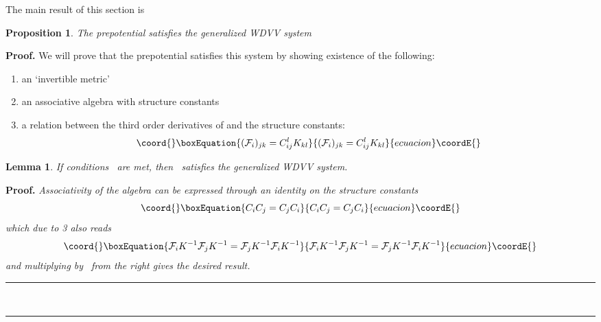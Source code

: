 \documentclass[a4paper,11pt]{article}
\newtheorem{lemma}[theorem]{Lemma}
\newtheorem{proposition}[theorem]{Proposition}
\newenvironment{proof}[1][Proof]{\textbf{#1.} }{\ \rule{0.5em}{0.5em}}
\numberwithin{equation}{section}
\begin{document}
\bigskip

\noindent The main result of this section is

\begin{proposition}
The prepotential satisfies the generalized WDVV system
\end{proposition}

\begin{proof}
We will prove that the prepotential satisfies this system by showing
existence of the following:

\begin{enumerate}
\item  an `invertible metric' \coordHE{}

\item  an associative algebra with structure constants \coordHE{}

\item  a relation between the third order derivatives of \coordHE{} and
the structure constants: 
\begin{equation}\coord{}\boxEquation{
(\mathcal{F}_{i})_{jk}=C_{ij}^{l}K_{kl}  \label{relation}
}{
(\mathcal{F}_{i})_{jk}=C_{ij}^{l}K_{kl}  }{ecuacion}\coordE{}\end{equation}
\end{enumerate}

\begin{lemma}
\textit{If conditions }\coordHE{}\textit{\ are met, then }\coordHE{}\textit{\ satisfies
the generalized WDVV system.}
\end{lemma}

\begin{proof}
\textit{Associativity of the algebra can be expressed through an identity on
the structure constants} 
\begin{equation}\coord{}\boxEquation{
C_{i}C_{j}=C_{j}C_{i}
}{
C_{i}C_{j}=C_{j}C_{i}
}{ecuacion}\coordE{}\end{equation}
\textit{which due to 3 also reads } 
\begin{equation}\coord{}\boxEquation{
\mathcal{F}_{i}K^{-1}\mathcal{F}_{j}K^{-1}=\mathcal{F}_{j}K^{-1}\mathcal{F}
_{i}K^{-1}
}{
\mathcal{F}_{i}K^{-1}\mathcal{F}_{j}K^{-1}=\mathcal{F}_{j}K^{-1}\mathcal{F}
_{i}K^{-1}
}{ecuacion}\coordE{}\end{equation}
\textit{and multiplying by }\coordHE{}\textit{\ from the right gives the
desired result.}
\end{proof}


\end{proof}
\end{document}
